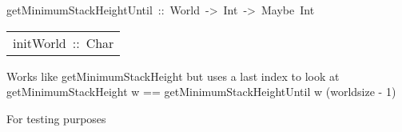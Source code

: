 \begin{haddockdesc}
\item[
getMinimumStackHeightUntil\ ::\ World\ ->\ Int\ ->\ Maybe\ Int
]
\end{haddockdesc}
\begin{haddockdesc}
\item[\begin{tabular}{@{}l}
initWorld\ ::\ {\char 91}{\char 91}{\char 91}Char{\char 93}{\char 93}{\char 93}
\end{tabular}]\haddockbegindoc
Works like getMinimumStackHeight but uses a last index to look at
  getMinimumStackHeight w == getMinimumStackHeightUntil w (worldsize - 1) 
\par
For testing purposes 
\par

\end{haddockdesc}